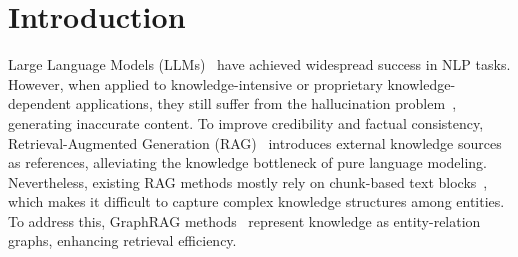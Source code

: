 \documentclass{article}
\theoremstyle{plain}
\theoremstyle{definition}
\theoremstyle{remark}
\begin{document}

\printAffiliationsAndNotice{}  %

\begin{abstract}
Retrieval-Augmented Generation (RAG) mitigates hallucination in LLMs by incorporating external knowledge, but relies on chunk-based retrieval that lacks structural semantics. GraphRAG methods improve RAG by modeling knowledge as entity-relation graphs, but still face challenges in high construction cost, fixed one-time retrieval, and reliance on long-context reasoning and prompt design. To address these challenges, we propose \texttt{\textbf{Graph-R1}}, the first agentic GraphRAG framework via end-to-end reinforcement learning (RL). It introduces lightweight knowledge hypergraph construction, models retrieval as a multi-turn agent-environment interaction, and optimizes the agent process via an end-to-end reward mechanism. Experiments on standard RAG datasets show that Graph-R1 outperforms traditional GraphRAG and RL-enhanced RAG methods in reasoning accuracy, retrieval efficiency, and generation quality. Our software and data are publicly available at \url{https://github.com/LHRLAB/Graph-R1}.
\end{abstract}

\section{Introduction}

Large Language Models (LLMs)~\citep{LLMsurvey} have achieved widespread success in NLP tasks. However, when applied to knowledge-intensive or proprietary knowledge-dependent applications, they still suffer from the hallucination problem~\citep{Hsurvey}, generating inaccurate content. To improve credibility and factual consistency, Retrieval-Augmented Generation (RAG)~\citep{RAG} introduces external knowledge sources as references, alleviating the knowledge bottleneck of pure language modeling. Nevertheless, existing RAG methods mostly rely on chunk-based text blocks~\citep{RAGsurvey}, which makes it difficult to capture complex knowledge structures among entities. To address this, GraphRAG methods~\citep{GraphRAG,LightRAG,HyperGraphRAG} represent knowledge as entity-relation graphs, enhancing retrieval efficiency.
\end{document}
